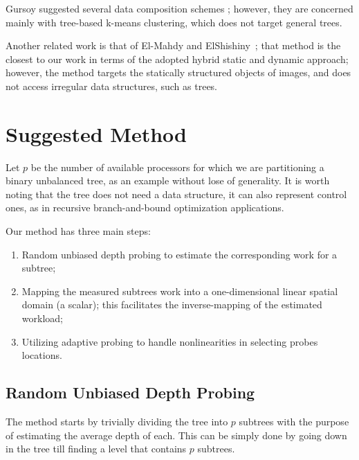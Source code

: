 \documentclass[conference,compsoc]{IEEEtran}
\begin{document}
	Gursoy suggested several data composition schemes \cite{gursoy2003}; however, they are concerned mainly with tree-based k-means clustering, which does not target general trees.
	
	Another related work is that of El-Mahdy and ElShishiny~\cite{El-Mahdy2011}; that method is the closest to our work in terms of the adopted hybrid static and dynamic approach; however, the method targets the statically structured objects of images, and does not access irregular data structures, such as trees.
	

\section{Suggested Method}
\label{methodology}
Let $ p $ be the number of available processors for which we are partitioning a binary unbalanced tree, as an example without lose of generality. It is worth noting that the tree does not need a data structure, it can also represent control ones, as in recursive branch-and-bound optimization applications.

Our method has three main steps:
\begin{enumerate}
	\item Random unbiased depth probing to estimate the corresponding work for a subtree;
	\item Mapping the measured subtrees work into a one-dimensional linear spatial domain (a scalar); this facilitates the inverse-mapping of the estimated workload;
	\item Utilizing adaptive probing to handle nonlinearities in selecting probes locations.
\end{enumerate}

\subsection{Random Unbiased Depth Probing}\label{subsec:randomProbing}
The method starts by trivially dividing the tree into $ p $ subtrees with the purpose of estimating the average depth of each. This can be simply done by going down in the tree till finding a level that contains $ p $ subtrees.
\end{document}
